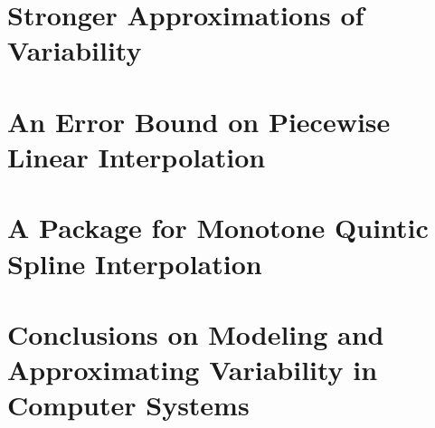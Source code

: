 \documentclass[singlespace,nopageskip]{VTthesis} %
\begin{document}
\chapter{Stronger Approximations of Variability} \label{ch:strong}


\chapter{An Error Bound on Piecewise Linear Interpolation} \label{ch:error}


\chapter{A Package for Monotone Quintic Spline Interpolation} \label{ch:splines}


\chapter{Conclusions on Modeling and Approximating Variability in Computer Systems} \label{ch:concs}







\appendix
\end{document}

